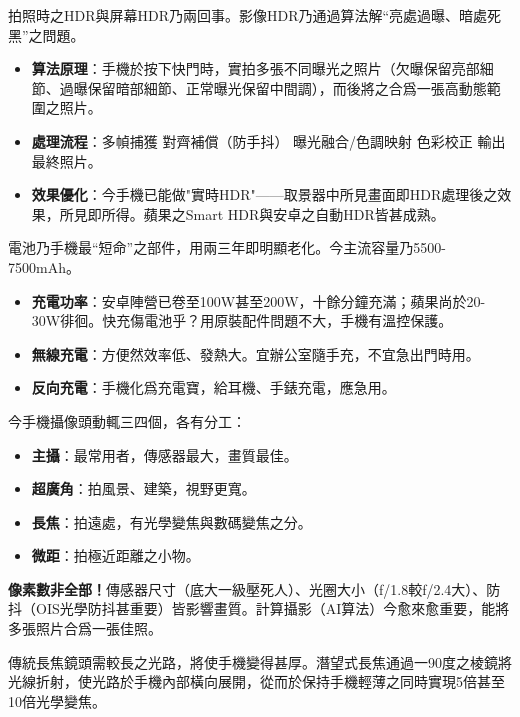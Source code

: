 
拍照時之HDR與屏幕HDR乃兩回事。影像HDR乃通過算法解“亮處過曝、暗處死黑”之問題。

\begin{itemize}
  \item \textbf{算法原理}：手機於按下快門時，實拍多張不同曝光之照片（欠曝保留亮部細節、過曝保留暗部細節、正常曝光保留中間調），而後將之合爲一張高動態範圍之照片。
  \item \textbf{處理流程}：多幀捕獲 對齊補償（防手抖） 曝光融合/色調映射 色彩校正 輸出最終照片。
  \item \textbf{效果優化}：今手機已能做"實時HDR"——取景器中所見畫面即HDR處理後之效果，所見即所得。蘋果之Smart HDR與安卓之自動HDR皆甚成熟。
\end{itemize}


電池乃手機最“短命”之部件，用兩三年即明顯老化。今主流容量乃5500-7500mAh。

\begin{itemize}
  \item \textbf{充電功率}：安卓陣營已卷至100W甚至200W，十餘分鐘充滿；蘋果尚於20-30W徘徊。快充傷電池乎？用原裝配件問題不大，手機有溫控保護。
  \item \textbf{無線充電}：方便然效率低、發熱大。宜辦公室隨手充，不宜急出門時用。
  \item \textbf{反向充電}：手機化爲充電寶，給耳機、手錶充電，應急用。
\end{itemize}


今手機攝像頭動輒三四個，各有分工：

\begin{itemize}
  \item \textbf{主攝}：最常用者，傳感器最大，畫質最佳。
  \item \textbf{超廣角}：拍風景、建築，視野更寬。
  \item \textbf{長焦}：拍遠處，有光學變焦與數碼變焦之分。
  \item \textbf{微距}：拍極近距離之小物。
\end{itemize}

\textbf{像素數非全部！}傳感器尺寸（底大一級壓死人）、光圈大小（f/1.8較f/2.4大）、防抖（OIS光學防抖甚重要）皆影響畫質。計算攝影（AI算法）今愈來愈重要，能將多張照片合爲一張佳照。


傳統長焦鏡頭需較長之光路，將使手機變得甚厚。潛望式長焦通過一90度之棱鏡將光線折射，使光路於手機內部橫向展開，從而於保持手機輕薄之同時實現5倍甚至10倍光學變焦。

